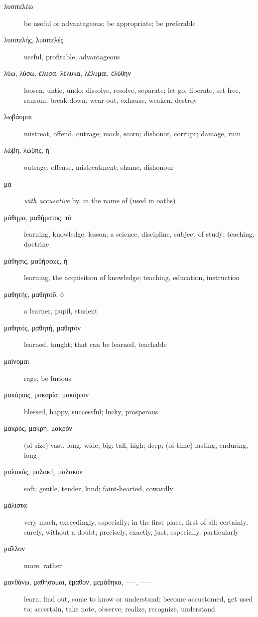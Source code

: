 \documentclass[12pt,letterpaper]{article}
\begin{document}
\begin{description}
    \item[\textgreek{λυσιτελέω}] be useful or advantageous; be appropriate; be preferable
    \item[\textgreek{λυσιτελής, λυσιτελές}] useful, profitable, advantageous
    \item[\textgreek{λύω, λύσω, ἔλυσα, λέλυκα, λέλυμαι, ἐλύθην}] \marginnote{*}loosen, untie, undo; dissolve, resolve, separate; let go, liberate, set free, ransom; break down, wear out, exhause, weaken, destroy
    \item[\textgreek{λωβάομαι}] mistreat, offend, outrage; mock, scorn; dishonor, corrupt; damage, ruin
    \item[\textgreek{λώβη, λώβης, ἡ}] outrage, offense, mistreatment; shame, dishonour
    \item[\textgreek{μά}] \textit{with accusative} by, in the name of (used in oaths)
    \item[\textgreek{μάθημα, μαθήματος, τό}] learning, knowledge, lesson; a science, discipline, subject of study; teaching, doctrine
    \item[\textgreek{μάθησις, μαθήσεως, ἡ}] learning, the acquisition of knowledge; teaching, education, instruction
    \item[\textgreek{μαθητής, μαθητοῦ, ὁ}] a learner, pupil, student
    \item[\textgreek{μαθητός, μαθητή, μαθητόν}] learned, taught; that can be learned, teachable
    \item[\textgreek{μαίνομαι}] rage, be furious
    \item[\textgreek{μακάριος, μακαρία, μακάριον}] blessed, happy, successful; lucky, prosperous
    \item[\textgreek{μακρός, μακρή, μακρόν}] \marginnote{*}(of size) vast, long, wide, big; tall, high; deep; (of time) lasting, enduring, long
    \item[\textgreek{μαλακός, μαλακή, μαλακόν}] soft; gentle, tender, kind; faint-hearted, cowardly
    \item[\textgreek{μάλιστα}] \marginnote{*}very much, exceedingly, especially; in the first place, first of all; certainly, surely, without a doubt; precisely, exactly, just; especially, particularly
    \item[\textgreek{μα̂λλον}] \marginnote{*}more, rather
    \item[\textgreek{μανθάνω, μαθήσομαι, ἔμαθον, μεμάθηκα, –––, –––}] \marginnote{*}learn, find out, come to know or understand; become accustomed, get used to; ascertain, take note, observe; realize, recognize, understand

\end{description}
\end{document}
